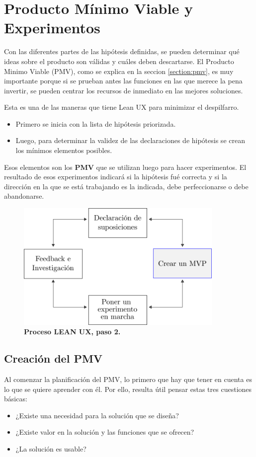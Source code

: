     



\clearpage
\section{Producto Mínimo Viable y Experimentos}
Con las diferentes partes de las hipótesis definidas, se pueden determinar qué ideas sobre el producto son válidas y cuáles deben descartarse. El Producto Minimo Viable (PMV), como se explica en la seccion \ref{section:pmv}, es muy importante porque si se prueban antes las funciones en las que merece la pena invertir, se pueden centrar los recursos de inmediato en las mejores soluciones. 


Esta es una de las maneras que tiene Lean UX para minimizar el despilfarro.
\begin{itemize}
    \item Primero se inicia con la lista de hipótesis priorizada.
    \item Luego, para determinar la validez de las declaraciones de hipótesis se crean los mínimos elementos posibles.
\end{itemize}
Esos elementos son los \textbf{PMV} que se utilizan luego para hacer experimentos. El resultado de esos experimentos indicará si la hipótesis fué correcta y si la dirección en la que se está trabajando es la indicada, debe perfeccionarse o debe abandonarse.

\begin{figure}[h]
\includegraphics[width=10cm]{Img/Desarrollo/desarrollo2.png}
\centering
\caption{\textbf{ \footnotesize{Proceso LEAN UX, paso 2. }}}
\end{figure}
\label{fig:leanux2}

\subsection{Creación del PMV}
Al comenzar la planificación del PMV, lo primero que hay que tener en cuenta es lo que se quiere aprender con él. Por ello, resulta útil pensar estas tres cuestiones básicas: 
\begin{itemize}
    \item ¿Existe una necesidad para la solución que se diseña? 
    \item ¿Existe valor en la solución y las funciones que se ofrecen?
    \item  ¿La solución es usable?
\end{itemize}

